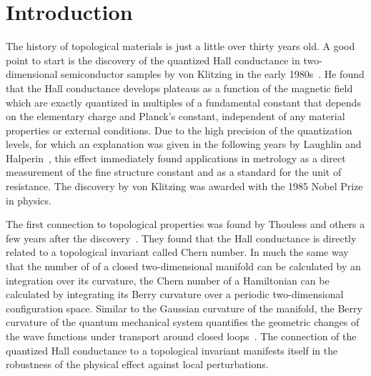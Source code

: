 \chapter*{Introduction}

The history of topological materials is just a little over thirty years old.
A good point to start is the discovery of the quantized Hall conductance in two-dimensional semiconductor samples by von Klitzing in the early 1980s~\cite{Klitzing1980,Klitzing1992}.
He found that the Hall conductance develops plateaus as a function of the magnetic field which are exactly quantized in multiples of a fundamental constant that depends on the elementary charge and Planck's constant, independent of any material properties or external conditions.
Due to the high precision of the quantization levels, for which an explanation was given in the following years by Laughlin and Halperin~\cite{Laughlin1981,Halperin1982}, this effect immediately found applications in metrology as a direct measurement of the fine structure constant and as a standard for the unit of resistance.
The discovery by von Klitzing was awarded with the 1985 Nobel Prize in physics.

The first connection to topological properties was found by Thouless and others a few years after the discovery~\cite{Thouless1982,Niu1985,Kohmoto1985,Avron1985,Kohmoto1989,Bellissard1994,Avron2003}.
They found that the Hall conductance is directly related to a topological invariant called Chern number.
In much the same way that the number of  of a closed two-dimensional manifold can be calculated by an integration over its curvature, the Chern number of a Hamiltonian can be calculated by integrating its Berry curvature over a periodic two-dimensional configuration space.
Similar to the Gaussian curvature of the manifold, the Berry curvature of the quantum mechanical system quantifies the geometric changes of the wave functions under transport around closed loops~\cite{Berry1984,Zak1989}.
The connection of the quantized Hall conductance to a topological invariant manifests itself in the robustness of the physical effect against local perturbations.

